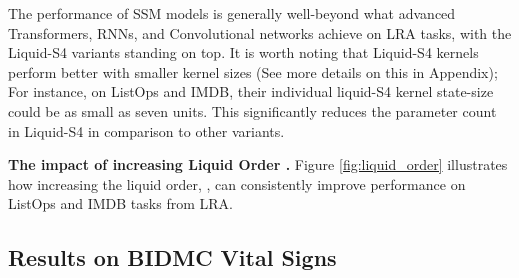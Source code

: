\documentclass{MITcsail}
\begin{document}
The performance of SSM models is generally well-beyond what advanced Transformers, RNNs, and Convolutional networks achieve on LRA tasks, with the Liquid-S4 variants standing on top. It is worth noting that Liquid-S4 kernels perform better with smaller kernel sizes (See more details on this in Appendix); For instance, on ListOps and IMDB, their individual liquid-S4 kernel state-size could be as small as seven units. This significantly reduces the parameter count in Liquid-S4 in comparison to other variants.

\noindent\textbf{The impact of increasing Liquid Order .} Figure \ref{fig:liquid_order} illustrates how increasing the liquid order, , can consistently improve performance on ListOps and IMDB tasks from LRA. 

\subsection{Results on BIDMC Vital Signs}
\end{document}
